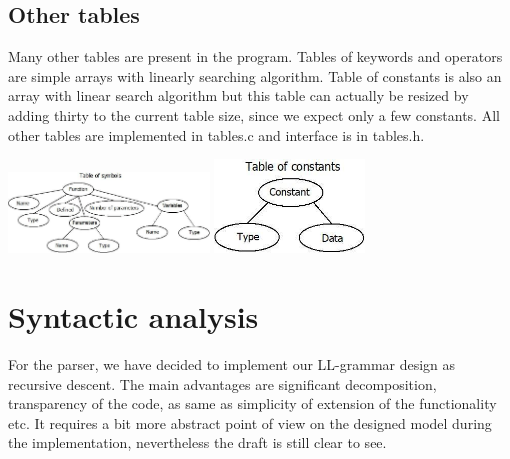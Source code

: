 \documentclass[10pt,a4paper,titlepage]{article}
\begin{document}
\subsection{Other tables}

\begin{justify}

Many other tables are present in the program. Tables of keywords and operators
are simple arrays with linearly searching algorithm. Table of constants is
also an array with linear search algorithm but this table can actually
be resized by adding thirty to the current table size, since we expect only a
few constants. All other tables are implemented in tables.c and interface
is in tables.h.

\end{justify}


\begin{multicols}{2}
  \includegraphics[width=0.4\textwidth]{img/TableOfSymbols.jpg}
  \includegraphics[width=0.3\textwidth]{img/TableOfConstans.jpg}
\end{multicols}

\newpage

\section{Syntactic analysis}

\begin{justify}
For the parser, we have decided to implement our LL-grammar design as
recursive descent. The main advantages are significant decomposition,
transparency of the code, as same as simplicity of extension of the
functionality etc. It requires a bit more abstract point of view on the
designed model during the implementation, nevertheless the draft is still
clear to see.
\end{justify}
\end{document}
